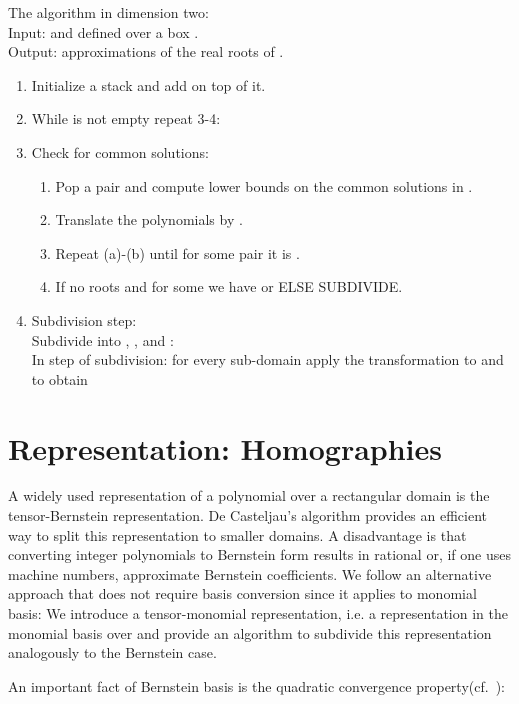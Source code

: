 \documentclass{sig-alternate}
\newenvironment{bc}{\noindent{\bf Bivariate case:}}{\hfill\medskip}
\begin{document}
\begin{bc}
The algorithm in dimension two:\\
Input:  and  defined over a box . \\
Output: approximations of  the real roots of . 
\begin{enumerate}
 \item Initialize a stack  and add  on top of it.
 \item While  is not empty repeat 3-4:

\item Check for common solutions:
\begin{enumerate}
 \item Pop a pair  and compute lower bounds  on the common solutions in .
 \item Translate the polynomials by .
 \item Repeat (a)-(b) until for some pair  it is .
 \item If no roots and for some  we have  or  ELSE SUBDIVIDE.
\end{enumerate}
\item Subdivision step:\\
Subdivide  into , ,  and :\\
In step  of subdivision: for every sub-domain apply the transformation  to  and  to obtain 
\end{enumerate}
\end{bc}
\fi 

\section{Representation: Homographies} \label{homography}


A widely used representation of a polynomial  over a rectangular
domain is the tensor-Bernstein representation. De Casteljau's
algorithm provides an efficient way to split this representation to
smaller domains. A disadvantage is that converting integer polynomials
to Bernstein form results in rational or, if one uses machine numbers,
approximate Bernstein coefficients. We follow an alternative approach
that does not require basis conversion since it applies to monomial
basis: We introduce a tensor-monomial representation, i.e. a
representation in the monomial basis over  and provide an algorithm to subdivide this representation
analogously to the Bernstein case.

An important fact of Bernstein basis is the quadratic convergence property(cf.~\cite[Theorem~2.1]{reif-2000}):
\end{document}
